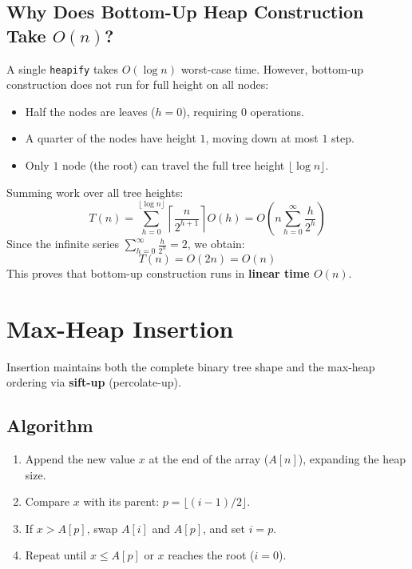\subsection{Why Does Bottom-Up Heap Construction Take $O(n)$?}

A single \texttt{heapify} takes $O(\log n)$ worst-case time. However, bottom-up construction does not run for full height on all nodes:
\begin{itemize}
    \item Half the nodes are leaves ($h=0$), requiring $0$ operations.
    \item A quarter of the nodes have height $1$, moving down at most $1$ step.
    \item Only $1$ node (the root) can travel the full tree height $\lfloor \log n \rfloor$.
\end{itemize}

Summing work over all tree heights:
\[
T(n) = \sum_{h=0}^{\lfloor \log n \rfloor} \left\lceil \frac{n}{2^{h+1}} \right\rceil O(h) = O\left( n \sum_{h=0}^{\infty} \frac{h}{2^h} \right)
\]
Since the infinite series $\sum_{h=0}^{\infty} \frac{h}{2^h} = 2$, we obtain:
\[
T(n) = O(2n) = O(n)
\]
This proves that bottom-up construction runs in \textbf{linear time $O(n)$}.

\section{Max-Heap Insertion}

Insertion maintains both the complete binary tree shape and the max-heap ordering via \textbf{sift-up} (percolate-up).

\subsection{Algorithm}
\begin{enumerate}
    \item Append the new value $x$ at the end of the array ($A[n]$), expanding the heap size.
    \item Compare $x$ with its parent: $p = \lfloor (i - 1)/2 \rfloor$.
    \item If $x > A[p]$, swap $A[i]$ and $A[p]$, and set $i = p$.
    \item Repeat until $x \leq A[p]$ or $x$ reaches the root ($i = 0$).
\end{enumerate}

